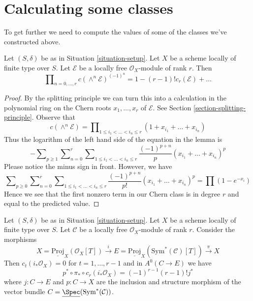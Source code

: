 \section{Calculating some classes}
\label{section-calculate}

\noindent
To get further we need to compute the values of some of the
classes we've constructed above.

\begin{lemma}
\label{lemma-compute-koszul}
Let $(S, \delta)$ be as in Situation \ref{situation-setup}. Let $X$
be a scheme locally of finite type over $S$. Let $\mathcal{E}$
be a locally free $\mathcal{O}_X$-module of rank $r$.
Then
$$
\prod\nolimits_{n = 0, \ldots, r} c(\wedge^n \mathcal{E})^{(-1)^n} =
1 - (r - 1)! c_r(\mathcal{E}) + \ldots
$$
\end{lemma}

\begin{proof}
By the splitting principle we can turn this into a calculation in the
polynomial ring on the Chern roots $x_1, \ldots, x_r$ of $\mathcal{E}$. See
Section \ref{section-splitting-principle}. Observe that
$$
c(\wedge^n \mathcal{E}) =
\prod\nolimits_{1 \leq i_1 < \ldots < i_n \leq r}
(1 + x_{i_1} + \ldots + x_{i_n})
$$
Thus the logarithm of the left hand side of the equation in the lemma is
$$
-
\sum\nolimits_{p \geq 1}
\sum\nolimits_{n = 0}^r
\sum\nolimits_{1 \leq i_1 < \ldots < i_n \leq r}
\frac{(-1)^{p + n}}{p}(x_{i_1} + \ldots + x_{i_n})^p
$$
Please notice the minus sign in front. However, we have
$$
\sum\nolimits_{p \geq 0}
\sum\nolimits_{n = 0}^r
\sum\nolimits_{1 \leq i_1 < \ldots < i_n \leq r}
\frac{(-1)^{p + n}}{p!}(x_{i_1} + \ldots + x_{i_n})^p
=
\prod (1 - e^{-x_i})
$$
Hence we see that the first nonzero term in our Chern class
is in degree $r$ and equal to the predicted value.
\end{proof}

\begin{lemma}
\label{lemma-compute-section}
Let $(S, \delta)$ be as in Situation \ref{situation-setup}. Let $X$
be a scheme locally of finite type over $S$. Let $\mathcal{C}$
be a locally free $\mathcal{O}_X$-module of rank $r$. Consider the
morphisms
$$
X = \underline{\text{Proj}}_X(\mathcal{O}_X[T])
\xrightarrow{i}
E = \underline{\text{Proj}}_X(\text{Sym}^*(\mathcal{C})[T])
\xrightarrow{\pi}
X
$$
Then $c_t(i_*\mathcal{O}_X) = 0$ for $t = 1, \ldots, r - 1$ and in
$A^0(C \to E)$ we have
$$
p^* \circ \pi_* \circ c_r(i_*\mathcal{O}_X) = (-1)^{r - 1}(r - 1)! j^*
$$
where
$j : C \to E$ and $p : C \to X$ are the inclusion and structure
morphism of the vector bundle
$C = \underline{\Spec}(\text{Sym}^*(\mathcal{C}))$.
\end{lemma}

